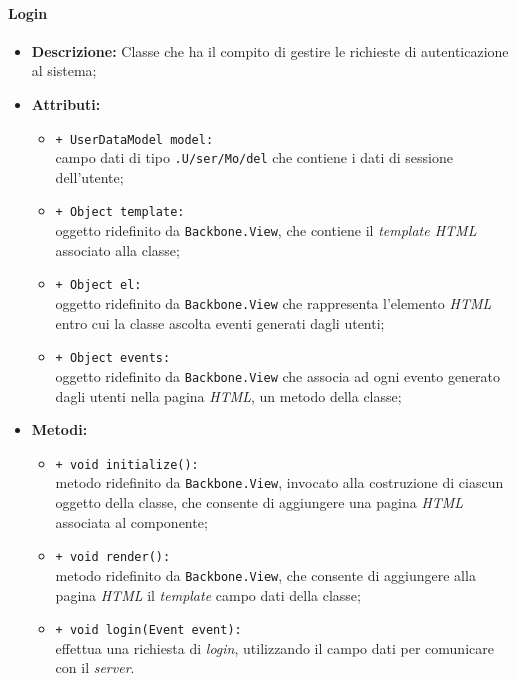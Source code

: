\paragraph{Login}
\begin{flushleft}
\begin{itemize}
\item \textbf{Descrizione:} Classe che ha il compito di gestire le richieste di autenticazione al sistema;
\item \textbf{Attributi:}
\begin{sloppypar}
\begin{itemize}
\item \texttt{+ UserDataModel model:}\\ campo dati di tipo \texttt{\model{}.U\fshyp{}ser\fshyp{}Mo\fshyp{}del} che contiene i dati di sessione dell'utente;
\item \texttt{+ Object template:}\\ oggetto ridefinito da \texttt{Backbone.View}, che contiene il \textit{template HTML} associato alla classe;
\item \texttt{+ Object el:}\\ oggetto ridefinito da \texttt{Backbone.View} che rappresenta l'elemento \textit{HTML} entro cui la classe ascolta eventi generati dagli utenti;
\item \texttt{+ Object events:}\\ oggetto ridefinito da \texttt{Backbone.View} che associa ad ogni evento generato dagli utenti nella pagina \textit{HTML}, un metodo della classe;
\end{itemize}
\end{sloppypar}
\item \textbf{Metodi:}
\begin{sloppypar}
\begin{itemize}
\item \texttt{+ void initialize():}\\ metodo ridefinito da \texttt{Backbone.View}, invocato alla costruzione di ciascun oggetto della classe, che consente di aggiungere una pagina \textit{HTML} associata al componente;
\item \texttt{+ void render():}\\ metodo ridefinito da \texttt{Backbone.View}, che consente di aggiungere alla pagina \textit{HTML} il \textit{template} campo dati della classe;
\item \texttt{+ void login(Event event):}\\ effettua una richiesta di \textit{login}, utilizzando il campo dati \model{} per comunicare con il \textit{server}.
\end{itemize}
\end{sloppypar}
\end{itemize}
\end{flushleft}

